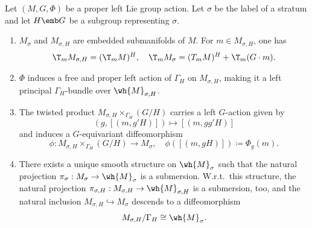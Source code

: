 \begin{prop}[{{\cite[Prop.~6.6.1]{RS1}}}]\label{prop strata}
    Let $(M,G,\Phi)$ be a proper left Lie group action. Let $\sigma$ be the label of a stratum and let $H\emb G$ be a subgroup representing $\sigma$.
    \begin{enumerate}
        \item $M_\sigma$ and $M_{\sigma,H}$ are embedded submanifolds of $M$. For $m\in M_{\sigma,H}$, one has 
        \[\T_m M_{\sigma,H}=(\T_m M)^H,\quad \T_m M_\sigma=(T_m M)^H+\T_m (G\cdot m).\]
        \item $\Phi$ induces a free and proper left action of $\Gamma_H$ on $M_{\sigma,H}$, making it a left principal $\Gamma_H$-bundle over $\wh{M}_{\sigma,H}$.
        \item The twisted product $M_{\sigma,H}\times_{\Gamma_H}(G\slash H)$ carries a left $G$-action given by 
        \[\left(g,\left[(m,g'H)\right]\right)\mapsto \left[(m,gg'H)\right]\]
        and induces a $G$-equivariant diffeomorphism 
        \[\phi:M_{\sigma,H}\times_{\Gamma_H}(G\slash H)\to M_\sigma,\quad \phi\left(\left[(m,gH)\right]\right)\coloneqq \Phi_g(m).\]
        \item There exists a unique smooth structure on $\wh{M}_\sigma$ such that the natural projection $\pi_\sigma:M_\sigma\to \wh{M}_\sigma$ is a submersion. W.r.t.\ this structure, the natural projection $\pi_{\sigma,H}:M_{\sigma,H}\to \wh{M}_{\sigma,H}$ is a submersion, too, and the natural inclusion $M_{\sigma,H}\hookrightarrow M_\sigma$ descends to a diffeomorphism 
        \[M_{\sigma,H}\slash \Gamma_H\cong \wh{M}_\sigma.\]
    \end{enumerate}
\end{prop}
